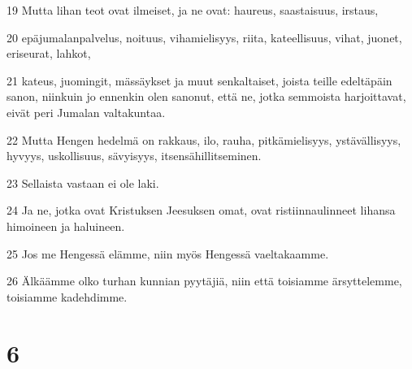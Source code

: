 \par 19 Mutta lihan teot ovat ilmeiset, ja ne ovat: haureus, saastaisuus, irstaus,
\par 20 epäjumalanpalvelus, noituus, vihamielisyys, riita, kateellisuus, vihat, juonet, eriseurat, lahkot,
\par 21 kateus, juomingit, mässäykset ja muut senkaltaiset, joista teille edeltäpäin sanon, niinkuin jo ennenkin olen sanonut, että ne, jotka semmoista harjoittavat, eivät peri Jumalan valtakuntaa.
\par 22 Mutta Hengen hedelmä on rakkaus, ilo, rauha, pitkämielisyys, ystävällisyys, hyvyys, uskollisuus, sävyisyys, itsensähillitseminen.
\par 23 Sellaista vastaan ei ole laki.
\par 24 Ja ne, jotka ovat Kristuksen Jeesuksen omat, ovat ristiinnaulinneet lihansa himoineen ja haluineen.
\par 25 Jos me Hengessä elämme, niin myös Hengessä vaeltakaamme.
\par 26 Älkäämme olko turhan kunnian pyytäjiä, niin että toisiamme ärsyttelemme, toisiamme kadehdimme.

\chapter{6}

